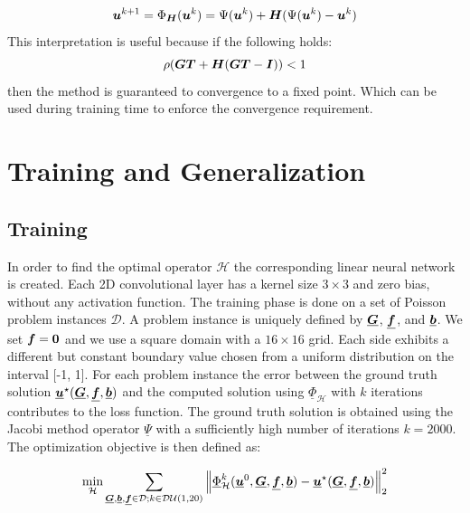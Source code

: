 \documentclass{rescience} %
\begin{document}
\begin{align*}
{\bm{u}}^{k+1} &= \Phi_{{\bm{H}}}({\bm{u}}^k) = \Psi({\bm{u}}^k) + {\bm{H}}(\Psi({\bm{u}}^k)-{\bm{u}}^k)\\
\label{jacobiMatrix}
\end{align*}
This interpretation is useful because if the following holds:
\begin{equation}
    \rho({\bm{G}}{\bm{T}}+{\bm{H}}({\bm{G}}{\bm{T}}-{\bm{I}})) < 1
    \label{Eq:spectral}
\end{equation}
then the method is guaranteed to convergence to a fixed point. Which can be used during training time to enforce the convergence requirement.

\section{Training and Generalization}
\subsection{Training}
In order to find the optimal operator $\mathcal{H}$ the corresponding linear neural network is created. Each 2D convolutional layer has a kernel size $3\times 3$ and zero bias, without any activation function. The training phase is done on a set of Poisson problem instances $\mathcal{D}$. A problem instance is uniquely defined by $\underline{{\bm{G}}}$, $\underline{{\bm{f}}}$, and $\underline{{\bm{b}}}$.
We set ${\bm{f}}=\bold{0}$ and we use a square domain with a $16\times16$ grid. Each side exhibits a different but constant boundary value chosen from a uniform distribution on the interval [-1, 1]. For each problem instance the error between the ground truth solution $\underline{{\bm{u}}} ^ {\star}(\underline{{\bm{G}}}, \underline{{\bm{f}}}, \underline{{\bm{b}}})$ and the computed solution using $\underline{\Phi}_{\mathcal{H}}$ with $k$ iterations contributes to the loss function. The ground truth solution is obtained using the Jacobi method operator $\underline{\Psi}$ with a sufficiently high number of iterations $k=2000$.
The optimization objective is then defined as:



\begin{align}
    \underset{\mathcal{H}}{\text{min}} \sum_{\underline{{\bm{G}}},\underline{{\bm{b}}},\underline{{\bm{f}}} \in \mathcal{D}; k \in \mathcal{DU}(1, 20)} \left \Vert \underline{\Phi}_{\mathcal{H}}^k (\underline{{\bm{u}}}^0, \underline{{\bm{G}}}, \underline{{\bm{f}}}, \underline{{\bm{b}}}) - \underline{{\bm{u}}} ^ {\star}(\underline{{\bm{G}}}, \underline{{\bm{f}}}, \underline{{\bm{b}}}) \right \Vert _2 ^ 2
\end{align}
\end{document}

